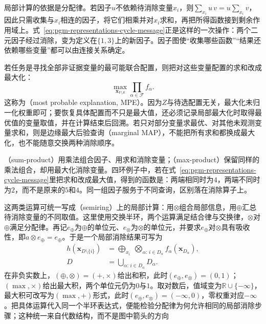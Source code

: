 局部计算的依据是分配律。若因子$u$不依赖待消除变量$x_i$，则$\sum_{x_i}u\,v=u\sum_{x_i}v$，因此只需收集与$x_i$相连的因子，将它们相乘并对$x_i$求和，再把所得函数接到剩余作用域上。式~\eqref{eq:pgm-representations-cycle-message}正是这样的一次操作：两个二元因子经过消除，变为定义在$\{1,3\}$上的新因子。因子图使“收集哪些函数”“结果还依赖哪些变量”都可以由连接关系确定。

若任务是寻找全部非证据变量的最可能联合配置，则把对这些变量配置的求和改成最大化：
\[
  \max_{\bm{x}_{V\setminus S}}
  \prod_{\alpha\in\mathcal{F}}f_\alpha.
\]
这称为（most probable explanation, MPE）。因为$Z$与待选配置无关，最大化未归一化权重即可；要恢复具体配置而不只是最大值，还必须记录局部最大化时取得最优值的变量取值，并在计算结束后回溯。若只对部分变量求最优、对其他未观测变量求和，则是边缘最大后验查询（marginal MAP），不能把所有求和都换成最大化，也不能随意交换两种消除顺序。

（sum-product）用乘法组合因子、用求和消除变量；（max-product）保留同样的乘法组合，却用最大化消除变量。四环例子中，若在式~\eqref{eq:pgm-representations-cycle-message}里把求和改成最大值，得到的函数是：两端相同时为$4$，两端不同时为$2$，而不是原来的$5$和$4$。同一组因子服务于不同查询，区别落在消除算子上。

这两类运算可统一写成（semiring）上的局部计算：用$\otimes$组合局部信息，用$\oplus$汇总待消除变量的不同取值。这里使用交换半环，两个运算满足结合律与交换律，$\otimes$对$\oplus$满足分配律。再记$e_\oplus$为$\oplus$的单位元、$e_\otimes$为$\otimes$的单位元，并要求$e_\oplus$对$\otimes$具有吸收性，即$a\otimes e_\oplus=e_\oplus$。于是一个局部消除结果可写为
\begin{equation}
  \begin{aligned}
    h(\bm{x}_{D\setminus\{i\}})
    &=
    \bigoplus_{x_i}
    \ \bigotimes_{\alpha:\,i\in D_\alpha}
    f_\alpha(\bm{x}_{D_\alpha}),\\
    D&=\bigcup_{\alpha:\,i\in D_\alpha}D_\alpha.
  \end{aligned}
  \label{eq:pgm-representations-semiring-elimination}
\end{equation}
在非负实数上，$(\oplus,\otimes)=(+,\times)$给出和积，此时$(e_\oplus,e_\otimes)=(0,1)$；$(\max,\times)$给出最大积，两个单位元仍为$0$与$1$。取对数后，值域变为$\mathbb{R}\cup\{-\infty\}$，最大积可改写为$(\max,+)$形式，此时$(e_\oplus,e_\otimes)=(-\infty,0)$，零权重对应$-\infty$。把具体运算代入同一个半环表达式，便能检验分配律为何允许相同的局部消除步骤；这种统一来自代数结构，而不是图中箭头的方向

